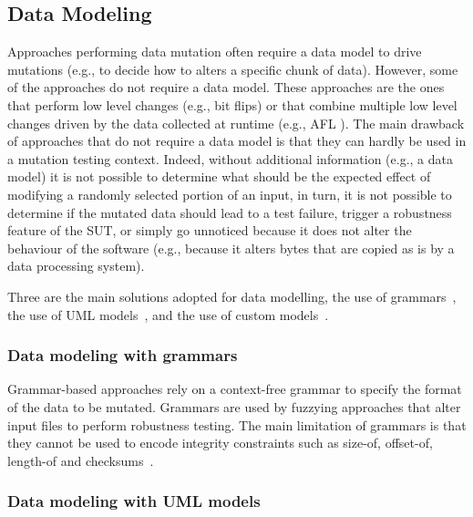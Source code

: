 
\subsection{Data Modeling}
\label{sec:dataModeling}

Approaches performing data mutation often require a data model to drive mutations (e.g., to decide how to alters a specific chunk of data). 
However, some of the approaches do not require a data model. 
These approaches are the ones that perform low level changes (e.g., bit flips) or that combine multiple low level changes driven by the data collected at runtime (e.g., AFL ).
The main drawback of approaches that do not require a data model is that they can hardly be used in a mutation testing context.
Indeed, without additional information (e.g., a data model) it is not possible to determine what should be the expected effect of modifying a randomly selected portion of an input, in turn, it is not possible to determine if the mutated data should lead to a test failure, trigger a robustness feature of the SUT, or simply go unnoticed because it does not alter the behaviour of the software (e.g., because it alters bytes that are copied as is by a data processing system).

Three are the main solutions adopted for data modelling, the use of grammars~\cite{Godefroid:GrammarBasedFuzzying:2008,godefroid2012sage,bounimova2013billions}, the use of UML models~\cite{di2015evolutionary}, and the use of custom models~\cite{pham2016model,PeachFuzzer}.

\subsubsection{Data modeling with grammars}

Grammar-based approaches rely on a context-free grammar to specify the format of the data to be mutated. Grammars are used by fuzzying approaches that alter input files to perform robustness testing.
The main limitation of grammars is that they cannot be used to encode integrity constraints such as size-of, offset-of, length-of and checksums~\cite{pham2016model}. 

\subsubsection{Data modeling with UML models}


